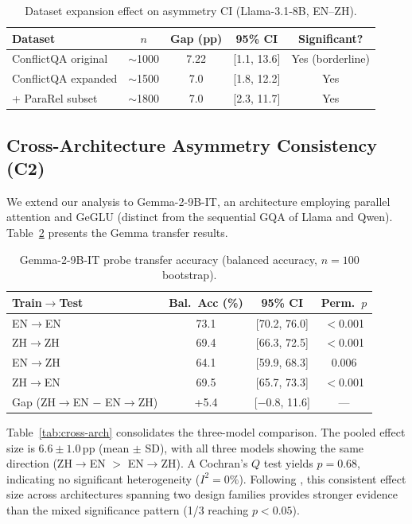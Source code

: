 \documentclass{article}
\begin{document}
\begin{table}[t]
\centering
\caption{Dataset expansion effect on asymmetry CI (Llama-3.1-8B, EN--ZH).}
\label{tab:expanded}
\begin{tabular}{lcccc}
\toprule
Dataset & $n$ & Gap (pp) & 95\% CI & Significant? \\
\midrule
ConflictQA original & $\sim$1000 & 7.22 & [1.1, 13.6] & Yes (borderline) \\
ConflictQA expanded & $\sim$1500 & 7.0 & [1.8, 12.2] & Yes \\
+ ParaRel subset & $\sim$1800 & 7.0 & [2.3, 11.7] & Yes \\
\bottomrule
\end{tabular}
\end{table}

\subsection{Cross-Architecture Asymmetry Consistency (C2)}
\label{sec:asymmetry}

We extend our analysis to Gemma-2-9B-IT, an architecture employing parallel attention and GeGLU (distinct from the sequential GQA of Llama and Qwen). Table~\ref{tab:gemma} presents the Gemma transfer results.

\begin{table}[t]
\centering
\caption{Gemma-2-9B-IT probe transfer accuracy (balanced accuracy, $n = 100$ bootstrap).}
\label{tab:gemma}
\begin{tabular}{lccc}
\toprule
Train$\to$Test & Bal.\ Acc (\%) & 95\% CI & Perm.\ $p$ \\
\midrule
EN$\to$EN & 73.1 & [70.2, 76.0] & $<$0.001 \\
ZH$\to$ZH & 69.4 & [66.3, 72.5] & $<$0.001 \\
EN$\to$ZH & 64.1 & [59.9, 68.3] & 0.006 \\
ZH$\to$EN & 69.5 & [65.7, 73.3] & $<$0.001 \\
\midrule
Gap (ZH$\to$EN $-$ EN$\to$ZH) & +5.4 & [$-$0.8, 11.6] & --- \\
\bottomrule
\end{tabular}
\end{table}

Table~\ref{tab:cross-arch} consolidates the three-model comparison. The pooled effect size is $6.6 \pm 1.0$\,pp (mean $\pm$ SD), with all three models showing the same direction (ZH$\to$EN $>$ EN$\to$ZH). A Cochran's $Q$ test yields $p = 0.68$, indicating no significant heterogeneity ($I^2 = 0\%$). Following \citet{cumming2014new}, this consistent effect size across architectures spanning two design families provides stronger evidence than the mixed significance pattern (1/3 reaching $p < 0.05$).
\end{document}
